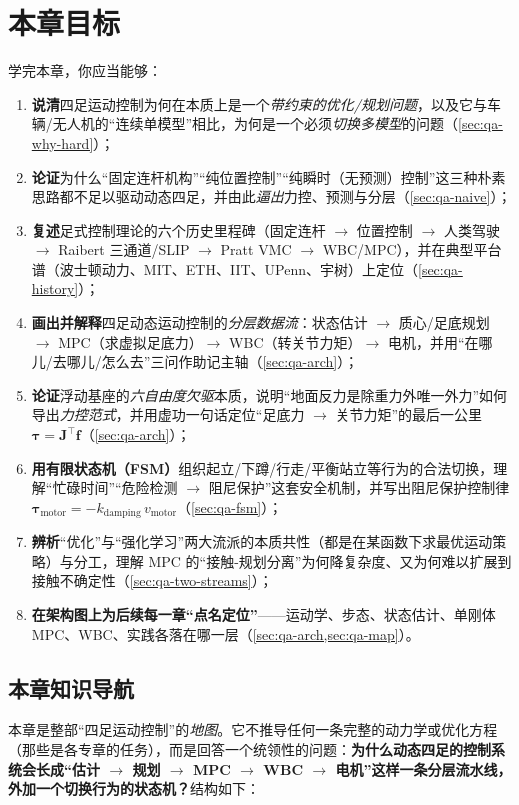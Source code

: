 \section*{本章目标}
学完本章，你应当能够：
\begin{enumerate}
  \item \textbf{说清}四足运动控制为何在本质上是一个\emph{带约束的优化/规划问题}，以及它与车辆/无人机的“连续单模型”相比，为何是一个必须\emph{切换多模型}的问题（\cref{sec:qa-why-hard}）；
  \item \textbf{论证}为什么“固定连杆机构”“纯位置控制”“纯瞬时（无预测）控制”这三种朴素思路都不足以驱动动态四足，并由此\emph{逼出}力控、预测与分层（\cref{sec:qa-naive}）；
  \item \textbf{复述}足式控制理论的六个历史里程碑（固定连杆 $\to$ 位置控制 $\to$ 人类驾驶 $\to$ Raibert 三通道/SLIP $\to$ Pratt VMC $\to$ WBC/MPC），并在典型平台谱（波士顿动力、MIT、ETH、IIT、UPenn、宇树）上定位（\cref{sec:qa-history}）；
  \item \textbf{画出并解释}四足动态运动控制的\emph{分层数据流}：状态估计 $\to$ 质心/足底规划 $\to$ MPC（求虚拟足底力）$\to$ WBC（转关节力矩）$\to$ 电机，并用“在哪儿/去哪儿/怎么去”三问作助记主轴（\cref{sec:qa-arch}）；
  \item \textbf{论证}浮动基座的\emph{六自由度欠驱}本质，说明“地面反力是除重力外唯一外力”如何导出\emph{力控范式}，并用虚功一句话定位“足底力 $\to$ 关节力矩”的最后一公里 $\boldsymbol\tau=\mathbf{J}^\top\mathbf{f}$（\cref{sec:qa-arch}）；
  \item \textbf{用有限状态机（FSM）}组织起立/下蹲/行走/平衡站立等行为的合法切换，理解“忙碌时间”“危险检测 $\to$ 阻尼保护”这套安全机制，并写出阻尼保护控制律 $\boldsymbol\tau_{\mathrm{motor}}=-k_{\mathrm{damping}}\,v_{\mathrm{motor}}$（\cref{sec:qa-fsm}）；
  \item \textbf{辨析}“优化”与“强化学习”两大流派的本质共性（都是在某函数下求最优运动策略）与分工，理解 MPC 的“接触-规划分离”为何降复杂度、又为何难以扩展到接触不确定性（\cref{sec:qa-two-streams}）；
  \item \textbf{在架构图上为后续每一章“点名定位”}——运动学、步态、状态估计、单刚体 MPC、WBC、实践各落在哪一层（\cref{sec:qa-arch,sec:qa-map}）。
\end{enumerate}

\subsection*{本章知识导航}
本章是整部“四足运动控制”的\emph{地图}。它不推导任何一条完整的动力学或优化方程（那些是各专章的任务），而是回答一个统领性的问题：\textbf{为什么动态四足的控制系统会长成“估计 $\to$ 规划 $\to$ MPC $\to$ WBC $\to$ 电机”这样一条分层流水线，外加一个切换行为的状态机？}结构如下：


